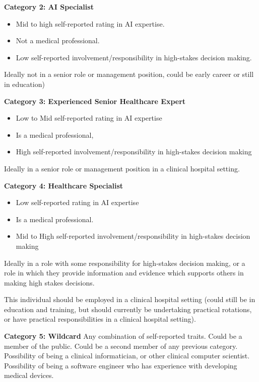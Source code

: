 \documentclass[manuscript,screen,review]{acmart}
\begin{document}
\textbf{Category 2: AI Specialist}
\begin{itemize}
\item Mid to high self-reported rating in AI expertise.
\item Not a medical professional.
\item Low self-reported involvement/responsibility in high-stakes decision making.
\end{itemize}

Ideally not in a senior role or management position, could be early career or still in education)

\textbf{Category 3: Experienced Senior Healthcare Expert}
\begin{itemize}
\item Low to Mid self-reported rating in AI expertise
\item Is a medical professional, 
\item High self-reported involvement/responsibility in high-stakes decision making
\end{itemize}

Ideally in a senior role or management position in a clinical hospital setting.

\textbf{Category 4: Healthcare Specialist}
\begin{itemize}
\item Low self-reported rating in AI expertise
\item Is a medical professional.
\item Mid to High self-reported involvement/responsibility in high-stakes decision making
\end{itemize}

Ideally in a role with some responsibility for high-stakes decision making, or a role in which they provide information and evidence which supports others in making high stakes decisions. 

This individual should be employed in a clinical hospital setting (could still be in education and training, but should currently be undertaking practical rotations, or have practical responsibilities in a clinical hospital setting). 


\textbf{Category 5: Wildcard}
Any combination of self-reported traits.
Could be a member of the public.
Could be a second member of any previous category. 
Possibility of being a clinical informatician, or other clinical computer scientist.
Possibility of being a software engineer who has experience with developing medical devices. 
\end{document}
